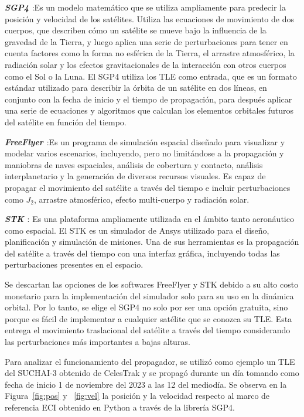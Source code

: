 \textbf{\textit{\gls{SGP4} \cite{ref37}}}:Es un modelo matemático que se utiliza ampliamente para predecir la posición y velocidad de los satélites. Utiliza las ecuaciones de movimiento de dos cuerpos, que describen cómo un satélite se mueve bajo la influencia de la gravedad de la Tierra, y luego aplica una serie de perturbaciones para tener en cuenta factores como la forma no esférica de la Tierra, el arrastre atmosférico, la radiación solar y los efectos gravitacionales de la interacción con otros cuerpos como el Sol o la Luna. El SGP4 utiliza los \gls{TLE} como entrada, que es un formato estándar utilizado para describir la órbita de un satélite en dos líneas, en conjunto con la fecha de inicio y el tiempo de propagación, para después aplicar una serie de ecuaciones y algoritmos que calculan los elementos orbitales futuros del satélite en función del tiempo.

\textbf{\textit{FreeFlyer \cite{ref38}}}:Es un programa de simulación espacial diseñado para visualizar y modelar varios escenarios, incluyendo, pero no limitándose a la propagación y maniobras de naves espaciales, análisis de cobertura y contacto, análisis interplanetario y la generación de diversos recursos visuales. Es capaz de propagar el movimiento del satélite a través del tiempo e incluir perturbaciones como $J_2$, arrastre atmosférico, efecto multi-cuerpo y radiación solar.

\textbf{\textit{\gls{STK} \cite{ref34}}}: Es una plataforma ampliamente utilizada en el ámbito tanto aeronáutico como espacial. El STK es un simulador de Ansys utilizado para el diseño, planificación y simulación de misiones. Una de sus herramientas es la propagación del satélite a través del tiempo con una interfaz gráfica, incluyendo todas las perturbaciones presentes en el espacio.

Se descartan las opciones de los softwares FreeFlyer y STK debido a su alto costo monetario para la implementación del simulador solo para su uso en la dinámica orbital. Por lo tanto, se elige el SGP4 no solo por ser una opción gratuita, sino porque es fácil de implementar a cualquier satélite que se conozca su TLE. Esta entrega el movimiento traslacional del satélite a través del tiempo considerando las perturbaciones más importantes a bajas alturas.

Para analizar el funcionamiento del propagador, se utilizó como ejemplo un TLE del SUCHAI-3 obtenido de CelesTrak y se propagó durante un día tomando como fecha de inicio 1 de noviembre del 2023 a las 12 del mediodía. Se observa en la Figura~\ref{fig:pos} y ~\ref{fig:vel} la posición y la velocidad respecto al marco de referencia ECI obtenido en Python a través de la librería SGP4.

